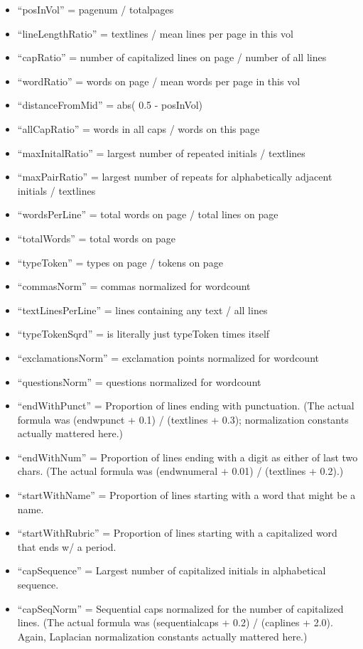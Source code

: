 \documentclass[paper=a4, fontsize=12pt]{scrartcl}
\numberwithin{equation}{section}		%
\numberwithin{figure}{section}			%
\numberwithin{table}{section}				%
\begin{document}
\begin{itemize}
\item ``posInVol'' = pagenum / totalpages
\item  ``lineLengthRatio'' = textlines / mean lines per page in this vol
\item  ``capRatio'' = number of capitalized lines on page / number of all lines
\item  ``wordRatio'' = words on page / mean words per page in this vol
\item  ``distanceFromMid'' = abs( 0.5 - posInVol)
\item  ``allCapRatio'' = words in all caps / words on this page
\item  ``maxInitalRatio'' = largest number of repeated initials / textlines
\item  ``maxPairRatio'' = largest number of repeats for alphabetically adjacent initials / textlines
\item  ``wordsPerLine'' = total words on page / total lines on page
\item  ``totalWords'' = total words on page
\item  ``typeToken'' = types on page / tokens on page
\item  ``commasNorm'' = commas normalized for wordcount
\item  ``textLinesPerLine'' = lines containing any text / all lines
\item  ``typeTokenSqrd'' = is literally just typeToken times itself
\item  ``exclamationsNorm'' = exclamation points normalized for wordcount
\item  ``questionsNorm'' = questions normalized for wordcount
\item  ``endWithPunct'' = Proportion of lines ending with punctuation. (The actual formula was (endwpunct + 0.1) / (textlines + 0.3); normalization constants actually mattered here.)
\item  ``endWithNum'' = Proportion of lines ending with a digit as either of last two chars. (The actual formula was (endwnumeral + 0.01) / (textlines + 0.2).)
\item  ``startWithName'' = Proportion of lines starting with a word that might be a name.
\item  ``startWithRubric'' = Proportion of lines starting with a capitalized word that ends w/ a period.
\item  ``capSequence'' = Largest number of capitalized initials in alphabetical sequence. 
\item  ``capSeqNorm'' = Sequential caps normalized for the number of capitalized lines. (The actual formula was (sequentialcaps + 0.2) / (caplines + 2.0). Again, Laplacian normalization constants actually mattered here.)

\end{itemize}
\end{document}

